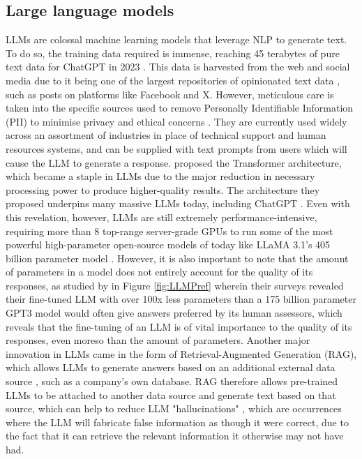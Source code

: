 \documentclass[12pt]{report}
\begin{document}
    \subsection{Large language models}
    LLMs are colossal machine learning models that leverage NLP to generate text. To do so, the training data required is immense, 
    reaching 45 terabytes of pure text data for ChatGPT in 2023 \autocite{dwivedi_so_2023}. This data is harvested from the web \autocite{dubey_llama_2024}
    and social media due to it being one of the largest repositories of opinionated text data \autocite{wang_fine-grained_2016}, 
    such as posts on platforms like Facebook and X. However, meticulous care is taken into the specific sources used to remove 
    Personally Identifiable Information (PII) to minimise privacy and ethical concerns \autocite{dubey_llama_2024}. They are currently used widely across 
    an assortment of industries in place of technical support and human resources systems, and can be supplied with text 
    prompts from users which will cause the LLM to generate a response. \textcite{vaswani_attention_2017} proposed the 
    Transformer architecture, which became a staple in LLMs due to the major reduction in necessary processing power to produce higher-quality 
    results. The architecture they proposed underpins many massive LLMs today, including ChatGPT \autocite{brown_language_2020}. Even with this revelation, however, LLMs are still extremely performance-intensive,
    requiring more than 8 top-range server-grade GPUs to run some of the most powerful high-parameter open-source models of today like LLaMA 3.1's 405 billion parameter model \autocite{dubey_llama_2024}.
    However, it is also important to note that the amount of parameters in a model does not entirely account for the quality of its responses, as studied by \textcite{ouyang_training_2022}
    in Figure \ref{fig:LLMPref} wherein their surveys revealed their fine-tuned LLM with over 100x less parameters than a 175 billion parameter 
    GPT3 model would often give answers preferred by its human assessors, which reveals that the fine-tuning of an LLM is of vital importance 
    to the quality of its responses, even moreso than the amount of parameters. Another major innovation in LLMs came in the form of Retrieval-Augmented 
    Generation (RAG), which allows LLMs to generate answers based on an additional external data source \autocite{lewis_retrieval-augmented_2021}, such as a company's own database.
    RAG therefore allows pre-trained LLMs to be attached to another data source and generate text based on that source, which can help to reduce 
    LLM "hallucinations" \autocite{lewis_retrieval-augmented_2021}, which are occurrences where the LLM will fabricate false information as though it were correct, 
    due to the fact that it can retrieve the relevant information it otherwise may not have had.
\end{document}
